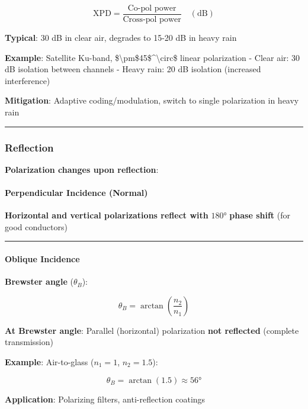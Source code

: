 \[
\text{XPD} = \frac{\text{Co-pol power}}{\text{Cross-pol power}} \quad (\text{dB})
\]

\textbf{Typical}: 30 dB in clear air, degrades to 15-20 dB in heavy rain

\textbf{Example}: Satellite Ku-band,
\$\textbackslash pm\$45\$\^{}\textbackslash circ\$ linear polarization -
Clear air: 30 dB isolation between channels - Heavy rain: 20 dB
isolation (increased interference)

\textbf{Mitigation}: Adaptive coding/modulation, switch to single
polarization in heavy rain

\begin{center}\rule{0.5\linewidth}{0.5pt}\end{center}

\subsubsection{Reflection}\label{reflection}

\textbf{Polarization changes upon reflection}:

\paragraph{Perpendicular Incidence
(Normal)}\label{perpendicular-incidence-normal}

\textbf{Horizontal and vertical polarizations reflect with} \(180°\)
\textbf{phase shift} (for good conductors)

\begin{center}\rule{0.5\linewidth}{0.5pt}\end{center}

\paragraph{Oblique Incidence}\label{oblique-incidence}

\textbf{Brewster angle} (\(\theta_B\)):

\[
\theta_B = \arctan\left(\frac{n_2}{n_1}\right)
\]

\textbf{At Brewster angle}: Parallel (horizontal) polarization
\textbf{not reflected} (complete transmission)

\textbf{Example}: Air-to-glass (\(n_1=1\), \(n_2=1.5\)):

\[
\theta_B = \arctan(1.5) \approx 56°
\]

\textbf{Application}: Polarizing filters, anti-reflection coatings

